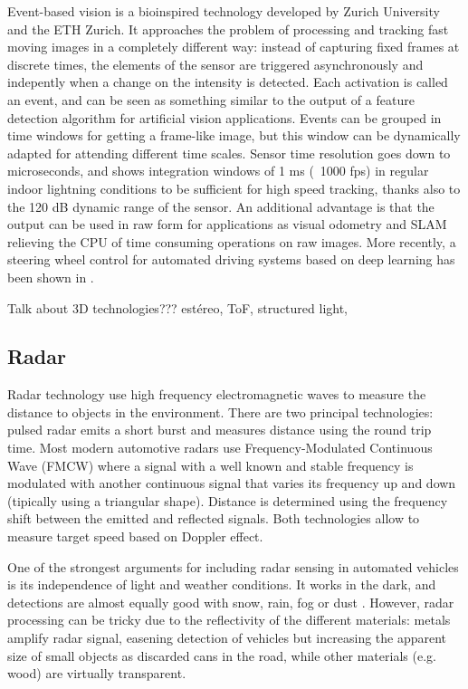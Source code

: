 Event-based vision is a bioinspired technology developed by Zurich University
and the ETH Zurich. It approaches the problem of processing and tracking fast 
moving images in a completely different way: instead of capturing fixed frames
at discrete times, the elements of the sensor are triggered asynchronously and
indepently when a change on the intensity is detected. Each activation is
called an event, and can be seen as something similar to the output of a 
feature detection algorithm for artificial vision applications.
Events can be grouped in time windows for getting a frame-like image, but this
window can be dynamically adapted for attending different time scales.
Sensor time resolution goes down to microseconds, and \cite{Mueggler2014} shows 
integration windows of 1 ms (~1000 fps) in regular indoor lightning conditions
to be sufficient for high speed tracking, thanks also to the 120 dB dynamic 
range of the sensor.
An additional advantage is that the output can be used in raw form for 
applications as visual odometry \cite{Censi2014} and SLAM \cite{Vidal2017}
relieving the CPU of time consuming operations on raw images.
More recently, a steering wheel control for automated driving systems 
based on deep learning has been shown in \cite{Maqueda2018}.
 
 
 
 Talk about 3D technologies??? estéreo, ToF, structured light, 
 

\subsection{Radar}

Radar technology use high frequency electromagnetic waves to measure the
distance to objects in the environment.
There are two principal technologies: pulsed radar emits a short burst and 
measures distance using the round trip time. Most modern automotive 
radars use Frequency-Modulated Continuous Wave (FMCW) where a signal with
a well known and stable frequency is modulated with another continuous signal
that varies its frequency up and down (tipically using a triangular shape).
Distance is determined using the frequency shift between the emitted and 
reflected signals. Both technologies allow to measure target speed based
on Doppler effect.

One of the strongest arguments for including radar sensing in automated 
vehicles is its independence of light and weather conditions. 
It works in the dark, and detections are almost equally good with snow, 
rain, fog or dust \cite{Reina2015}.
However, radar processing can be tricky due to the reflectivity of the
different materials: metals amplify radar signal, easening detection of 
vehicles but increasing the apparent size of small objects as discarded cans
in the road, while other materials (e.g. wood) are virtually transparent.

